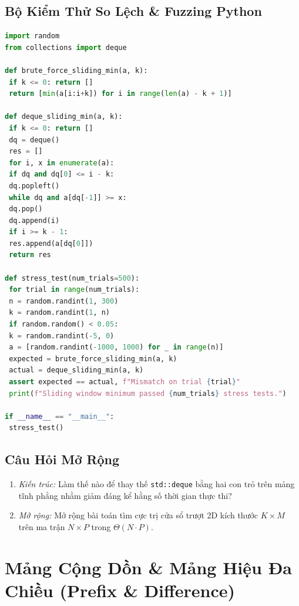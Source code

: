 \documentclass[11pt, letterpaper]{report}
\begin{document}
\section{Bộ Kiểm Thử So Lệch \& Fuzzing Python}
\begin{lstlisting}[language=Python, caption={Python Differential Fuzzer for Sliding Window}]
import random
from collections import deque

def brute_force_sliding_min(a, k):
 if k <= 0: return []
 return [min(a[i:i+k]) for i in range(len(a) - k + 1)]

def deque_sliding_min(a, k):
 if k <= 0: return []
 dq = deque()
 res = []
 for i, x in enumerate(a):
 if dq and dq[0] <= i - k:
 dq.popleft()
 while dq and a[dq[-1]] >= x:
 dq.pop()
 dq.append(i)
 if i >= k - 1:
 res.append(a[dq[0]])
 return res

def stress_test(num_trials=500):
 for trial in range(num_trials):
 n = random.randint(1, 300)
 k = random.randint(1, n)
 if random.random() < 0.05:
 k = random.randint(-5, 0)
 a = [random.randint(-1000, 1000) for _ in range(n)]
 expected = brute_force_sliding_min(a, k)
 actual = deque_sliding_min(a, k)
 assert expected == actual, f"Mismatch on trial {trial}"
 print(f"Sliding window minimum passed {num_trials} stress tests.")

if __name__ == "__main__":
 stress_test()
\end{lstlisting}

\section{Câu Hỏi Mở Rộng}
\begin{enumerate}
 \item \textit{Kiến trúc:} Làm thế nào để thay thế \texttt{std::deque} bằng hai con trỏ trên mảng tĩnh phẳng nhằm giảm đáng kể hằng số thời gian thực thi?
 \item \textit{Mở rộng:} Mở rộng bài toán tìm cực trị cửa sổ trượt 2D kích thước $K \times M$ trên ma trận $N \times P$ trong $\Theta(N \cdot P)$.
\end{enumerate}

\chapter{Mảng Cộng Dồn \& Mảng Hiệu Đa Chiều (Prefix \& Difference)}
\label{mod:prefix_difference}
\end{document}
